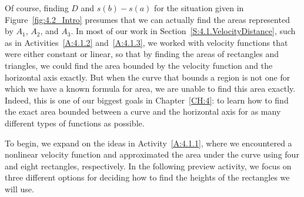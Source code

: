 Of course, finding $D$ and $s(b)-s(a)$ for the situation given in Figure~\ref{fig:4.2_Intro} presumes that we can actually find the areas represented by $A_1$, $A_2$, and $A_3$.  In most of our work in Section~\ref{S:4.1.VelocityDistance}, such as in Activities~\ref{A:4.1.2} and~\ref{A:4.1.3}, we worked with velocity functions that were either constant or linear, so that by finding the areas of rectangles and triangles, we could find the area bounded by the velocity function and the horizontal axis exactly.  But when the curve that bounds a region is not one for which we have a known formula for area, we are unable to find this area exactly.  Indeed, this is one of our biggest goals in Chapter~\ref{CH:4}: to learn how to find the exact area bounded between a curve and the horizontal axis for as many different types of functions as possible.  

To begin, we expand on the ideas in Activity~\ref{A:4.1.1}, where we encountered a nonlinear velocity function and approximated the area under the curve using four and eight rectangles, respectively.  In the following preview activity, we focus on three different options for deciding how to find the heights of the rectangles we will use.


